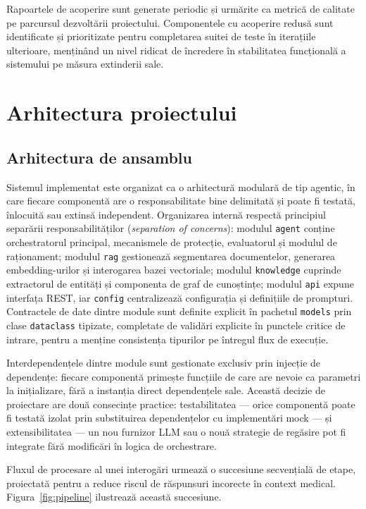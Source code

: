\documentclass[12pt, a4paper, oneside, romanian]{teza-upb}
\begin{document}
Rapoartele de acoperire sunt generate periodic și urmărite ca metrică de calitate pe parcursul dezvoltării proiectului. Componentele cu acoperire redusă sunt identificate și prioritizate pentru completarea suitei de teste în iterațiile ulterioare, menținând un nivel ridicat de încredere în stabilitatea funcțională a sistemului pe măsura extinderii sale.

\chapter{Arhitectura proiectului}

\section{Arhitectura de ansamblu}
\label{sec:ansamblu}

Sistemul implementat este organizat ca o arhitectură modulară de tip agentic, în care fiecare componentă are o responsabilitate bine delimitată și poate fi testată, înlocuită sau extinsă independent. Organizarea internă respectă principiul separării responsabilităților (\textit{separation of concerns}): modulul \texttt{agent} conține orchestratorul principal, mecanismele de protecție, evaluatorul și modulul de raționament; modulul \texttt{rag} gestionează segmentarea documentelor, generarea embedding-urilor și interogarea bazei vectoriale; modulul \texttt{knowledge} cuprinde extractorul de entități și componenta de graf de cunoștințe; modulul \texttt{api} expune interfața REST, iar \texttt{config} centralizează configurația și definițiile de prompturi. Contractele de date dintre module sunt definite explicit în pachetul \texttt{models} prin clase \texttt{dataclass} tipizate, completate de validări explicite în punctele critice de intrare, pentru a menține consistența tipurilor pe întregul flux de execuție.

Interdependențele dintre module sunt gestionate exclusiv prin injecție de dependențe: fiecare componentă primește funcțiile de care are nevoie ca parametri la inițializare, fără a instanția direct dependențele sale. Această decizie de proiectare are două consecințe practice: testabilitatea — orice componentă poate fi testată izolat prin substituirea dependențelor cu implementări mock — și extensibilitatea — un nou furnizor LLM sau o nouă strategie de regăsire pot fi integrate fără modificări în logica de orchestrare.

Fluxul de procesare al unei interogări urmează o succesiune secvențială de etape, proiectată pentru a reduce riscul de răspunsuri incorecte în context medical. Figura~\ref{fig:pipeline} ilustrează această succesiune.
\end{document}
